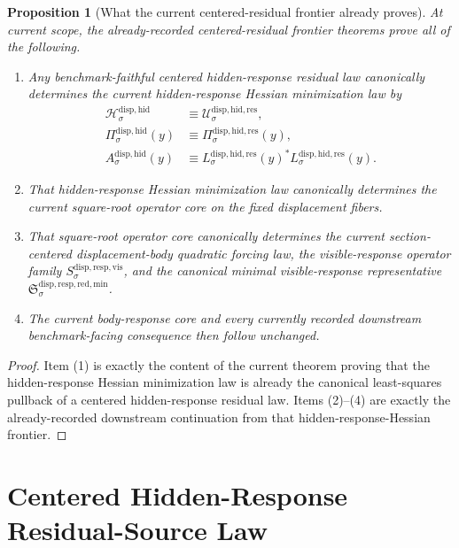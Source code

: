 \documentclass[11pt]{article}
\newcommand{\VisibleResponseOperator}[1]{S_{#1}^{\mathrm{disp,resp,vis}}}
\newcommand{\MinimalReducedStructure}{\mathfrak S^{\mathrm{disp,resp,red,min}}}
\newcommand{\HiddenCarrier}[1]{\mathcal H_{#1}^{\mathrm{disp,hid}}}
\newcommand{\HiddenReadout}[1]{\Pi_{#1}^{\mathrm{disp,hid}}}
\newcommand{\HiddenHessian}[1]{A_{#1}^{\mathrm{disp,hid}}}
\newcommand{\ResidualState}[1]{\mathcal U_{#1}^{\mathrm{disp,hid,res}}}
\newcommand{\ResidualReadout}[1]{\Pi_{#1}^{\mathrm{disp,hid,res}}}
\newcommand{\ResidualOperator}[1]{L_{#1}^{\mathrm{disp,hid,res}}}
\newtheorem{proposition}{Proposition}
\begin{document}
\begin{proposition}[What the current centered-residual frontier already proves]
\label{prop:frontier}
At current scope, the already-recorded centered-residual frontier theorems prove all of the following.
\begin{enumerate}
    \item Any benchmark-faithful centered hidden-response residual law canonically determines the current hidden-response Hessian minimization law by
    \[
    \begin{aligned}
    \HiddenCarrier{\sigma}
    &\equiv
    \ResidualState{\sigma},\\
    \HiddenReadout{\sigma}(y)
    &\equiv
    \ResidualReadout{\sigma}(y),\\
    \HiddenHessian{\sigma}(y)
    &\equiv
    \ResidualOperator{\sigma}(y)^*\ResidualOperator{\sigma}(y).
    \end{aligned}
    \]
    \item That hidden-response Hessian minimization law canonically determines the current square-root operator core on the fixed displacement fibers.
    \item That square-root operator core canonically determines the current section-centered displacement-body quadratic forcing law, the visible-response operator family \(\VisibleResponseOperator{\sigma}\), and the canonical minimal visible-response representative \(\MinimalReducedStructure_{\sigma}\).
    \item The current body-response core and every currently recorded downstream benchmark-facing consequence then follow unchanged.
\end{enumerate}
\end{proposition}

\begin{proof}
Item (1) is exactly the content of the current theorem proving that the hidden-response Hessian minimization law is already the canonical least-squares pullback of a centered hidden-response residual law. Items (2)--(4) are exactly the already-recorded downstream continuation from that hidden-response-Hessian frontier.
\end{proof}

\section{Centered Hidden-Response Residual-Source Law}
\end{document}
